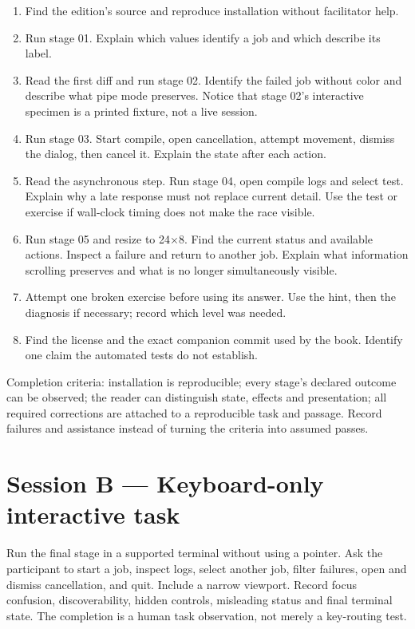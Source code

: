 \begin{enumerate}
\item Find the edition's source and reproduce installation without facilitator help.
\item Run stage 01. Explain which values identify a job and which describe its label.
\item Read the first diff and run stage 02. Identify the failed job without color and describe what pipe mode preserves. Notice that stage 02's interactive specimen is a printed fixture, not a live session.
\item Run stage 03. Start compile, open cancellation, attempt movement, dismiss the dialog, then cancel it. Explain the state after each action.
\item Read the asynchronous step. Run stage 04, open compile logs and select test. Explain why a late response must not replace current detail. Use the test or exercise if wall-clock timing does not make the race visible.
\item Run stage 05 and resize to 24×8. Find the current status and available actions. Inspect a failure and return to another job. Explain what information scrolling preserves and what is no longer simultaneously visible.
\item Attempt one broken exercise before using its answer. Use the hint, then the diagnosis if necessary; record which level was needed.
\item Find the license and the exact companion commit used by the book. Identify one claim the automated tests do not establish.
\end{enumerate}

Completion criteria: installation is reproducible; every stage's declared outcome can be observed; the reader can distinguish state, effects and presentation; all required corrections are attached to a reproducible task and passage. Record failures and assistance instead of turning the criteria into assumed passes.

\section{Session B — Keyboard-only interactive task}

Run the final stage in a supported terminal without using a pointer. Ask the participant to start a job, inspect logs, select another job, filter failures, open and dismiss cancellation, and quit. Include a narrow viewport. Record focus confusion, discoverability, hidden controls, misleading status and final terminal state. The completion is a human task observation, not merely a key-routing test.

